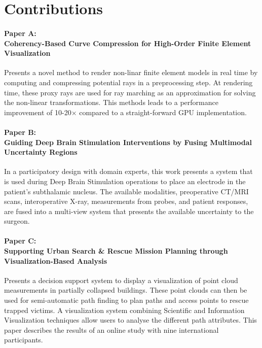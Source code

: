 \chapter*{Contributions}

\subsubsection{Paper A:\\Coherency-Based Curve Compression for High-Order Finite Element Visualization}
Presents a novel method to render non-linar finite element models in real time by computing and compressing potential rays in a preprocessing step. At rendering time, these proxy rays are used for ray marching as an approximation for solving the non-linear transformations. This methods leads to a performance improvement of 10-20$\times$ compared to a straight-forward GPU implementation.%

\subsubsection{Paper B:\\Guiding Deep Brain Stimulation Interventions by Fusing Multimodal Uncertainty Regions}
In a participatory design with domain experts, this work presents a system that is used during Deep Brain Stimulation operations to place an electrode in the patient's subthalamic nucleus. The available modalities, preoperative CT/MRI scans, interoperative X-ray, measurements from probes, and patient responses, are fused into a multi-view system that presents the available uncertainty to the surgeon.%

\subsubsection{Paper C:\\Supporting Urban Search \& Rescue Mission Planning through \\Visualization-Based Analysis}
Presents a decision support system to display a  visualization of point cloud measurements in partially collapsed buildings. These point clouds can then be used for semi-automatic path finding to plan paths and access points to rescue trapped victims. A visualization system combining Scientific and Information Visualization techniques allow users to analyse the different path attributes. This paper describes the results of an online study with nine international participants.%

